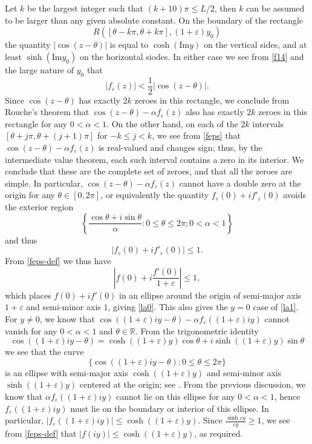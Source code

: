 \documentclass[12pt]{amsart}
\newcommand{\eps}{\varepsilon}
\newcommand{\R}{\mathbb{R}}
\begin{document}
Let $k$ be the largest integer such that $(k+10) \pi \leq L/2$, then $k$ can be assumed to be larger than any given absolute constant.  On the boundary of the rectangle
$$ R\left([\theta-k\pi, \theta+k\pi], (1+\eps) y_0\right)$$
the quantity $|\cos(z-\theta)|$ is equal to $\cosh(\mathrm{Im} y)$ on the vertical sides, and at least $\sinh(\mathrm{Im} y_0)$ on the horizontal siodes.  In either case we see from \eqref{f14} and the large nature of $y_0$ that
$$ |f_{\eps}(z)| < \frac{1}{2} |\cos(z - \theta)|.$$
Since $\cos(z-\theta)$ has exactly $2k$ zeroes in this rectangle, we conclude from Rouche's theorem that $\cos(z-\theta) - \alpha f_\eps(z)$ also has exactly $2k$ zeroes in this rectangle for any $0 <\alpha<1$.  On the other hand, on each of the $2k$ intervals $[\theta + j\pi, \theta + (j+1) \pi]$ for $-k \leq j < k$, we see from \eqref{feps} that $\cos(z-\theta) - \alpha f_\eps(z)$ is real-valued and changes sign; thus, by the intermediate value theorem, each such interval contains a zero in its interior.  We conclude that these are the complete set of zeroes, and that all the zeroes are simple.  In particular, $\cos(z-\theta) - \alpha f_\eps(z)$ cannot have a double zero at the origin for any $\theta \in [0,2\pi]$, or equivalently the quantity $f_\eps(0) + i f'_\eps(0)$ avoids the exterior region
$$\left\{ \frac{\cos \theta + i \sin \theta}{\alpha} : 0 \leq \theta \leq 2\pi; 0 < \alpha < 1\right\}$$
and thus
$$ |f_\eps(0) + i f'_\eps(0)| \leq 1.$$
From \eqref{feps-def} we thus have
$$ \left|f(0) + i \frac{f'(0)}{1+\eps}\right| \leq 1,$$
which places $f(0)+if'(0)$ in an ellipse around the origin of semi-major axis $1+\eps$ and semi-minor axis $1$, giving \eqref{la0}. This also gives the $y=0$ case of \eqref{la1}. For $y \neq 0$, we know that $\cos((1+\eps)iy-\theta) - \alpha f_\eps((1+\eps)iy)$ cannot vanish for any $0 < \alpha < 1$ and $\theta \in \R$.  From the trigonometric identity
$$ \cos((1+\eps)iy-\theta) = \cosh((1+\eps) y) \cos \theta + i \sinh((1+\eps) y) \sin \theta$$
we see that the curve
$$ \{ \cos((1+\eps)iy-\theta): 0 \leq \theta \leq 2\pi \}$$
is an ellipse with semi-major axis $\cosh((1+\eps) y)$ and semi-minor axis $\sinh((1+\eps) y)$ centered at the origin; see .  From the previous discussion, we know that $\alpha f_\eps((1+\eps)iy)$ cannot lie on this ellipse for any $0 < \alpha < 1$, hence $f_\eps((1+\eps)iy)$ must lie on the boundary or interior of this ellipse.  In particular, $|f_\eps((1+\eps)iy)| \leq \cosh((1+\eps) y)$.
Since $\frac{\sinh \eps y}{\eps y} \geq 1$, we see from \eqref{feps-def} that $|f(iy)| \leq \cosh((1+\eps) y)$, as required.
\end{document}
